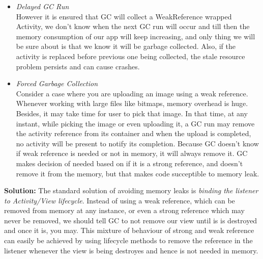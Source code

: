 \documentclass[journal]{IEEEtran}
\begin{document}
\begin{itemize}
	\item \textit{Delayed GC Run}\\
	However it is ensured that GC will collect a WeakReference wrapped Activity, we don't know when the next GC run will occur and till then the memory consumption of our app will keep increasing, and only thing we will be sure about is that we know it will be garbage collected. 
	Also, if the activity is replaced before previous one being collected, the stale resource problem persists and can cause crashes.
	
	\item \textit{Forced Garbage Collection}\\
	Consider a case where you are uploading an image using a weak reference. Whenever working with large files like bitmaps, memory overhead is huge. Besides, it may take time for user to pick that image. In that time, at any instant, while picking the image or even uploading it, a GC run may remove the activity reference from its container and when the upload is completed, no activity will be present to notify its completion. 
	Because GC doesn't know if weak reference is needed or not in memory, it will always remove it. GC makes decision of needed based on if it is a strong reference, and doesn't remove it from the memory, but that makes code succeptible to memory leak.
\end{itemize}

\textbf{Solution:} The standard solution of avoiding memory leaks is \textit{binding the listener to Activity/View lifecycle}. Instead of using a weak reference, which can be removed from memory at any instance, or even a strong reference which may never be removed, we should tell GC to not remove our view until is is destroyed and once it is, you may. This mixture of behaviour of strong and weak reference can easily be achieved by using lifecycle methods to remove the reference in the listener whenever the view is being destroyes and hence is not needed in memory.
\end{document}
